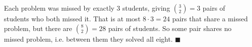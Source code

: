 Each problem was missed by exactly $3$ students, giving $\binom32=3$ pairs of students who both missed it. That is at most $8\cdot3=24$ pairs that share a missed problem, but there are $\binom82=28$ pairs of students. So some pair shares no missed problem, i.e. between them they solved all eight. $\blacksquare$
